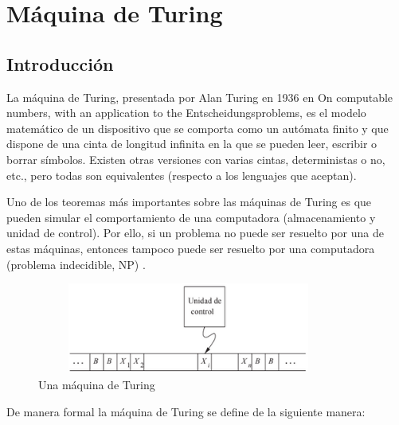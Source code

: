 \section{Máquina de Turing}
\subsection{Introducción}
La máquina de Turing, presentada por Alan Turing en 1936 en On computable numbers, with an application to the Entscheidungsproblems, es el modelo matemático de un dispositivo que se comporta como un autómata finito y que dispone de una cinta de longitud infinita en la que se pueden leer, escribir o borrar símbolos. Existen otras versiones con varias cintas, deterministas o no, etc., pero todas son equivalentes (respecto a los lenguajes que aceptan).

Uno de los teoremas más importantes sobre las máquinas de Turing es que pueden simular el comportamiento de una computadora (almacenamiento y unidad de control). Por ello, si un problema no puede ser resuelto por una de estas máquinas, entonces tampoco puede ser resuelto por una computadora (problema indecidible, NP) \cite{LIBRO}.

\begin{figure}[H]
\begin{center}
 \includegraphics[width=10cm, height=3cm]{./img/maquina.png}
 \caption{Una máquina de Turing}
 \label{fig:diagrama}
\end{center}
\end{figure}

De manera formal la máquina de Turing se define de la siguiente manera:

